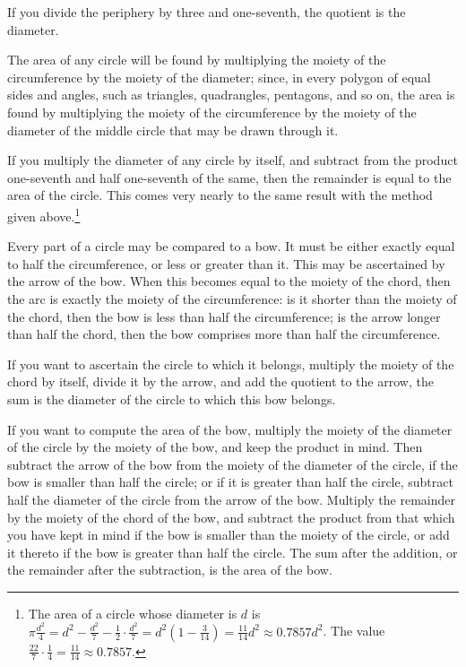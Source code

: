 If you divide the periphery by three and one-seventh, the quotient is the diameter.

The area of any circle will be found by multiplying the moiety of the circumference by the moiety of the diameter; since, in every polygon of equal sides and angles, such as triangles, quadrangles, pentagons, and so on, the area is found by multiplying the moiety of the circumference by the moiety of the diameter of the middle circle that may be drawn through it.

If you multiply the diameter of any circle by itself, and subtract from the product one-seventh and half one-seventh of the same, then the remainder is equal to the area of the circle. This comes very nearly to the same result with the method given above.\footnote{The area of a circle whose diameter is $d$ is $\pi\frac{d^2}{4} = d^2 - \frac{d^2}{7} - \frac{1}{2} \cdot \frac{d^2}{7} = d^2(1 - \frac{3}{14}) = \frac{11}{14}d^2 \approx 0.7857d^2$. The value $\frac{22}{7} \cdot \frac{1}{4} = \frac{11}{14} \approx 0.7857$.}

Every part of a circle may be compared to a bow. It must be either exactly equal to half the circumference, or less or greater than it. This may be ascertained by the arrow of the bow. When this becomes equal to the moiety of the chord, then the arc is exactly the moiety of the circumference: is it shorter than the moiety of the chord, then the bow is less than half the circumference; is the arrow longer than half the chord, then the bow comprises more than half the circumference.

If you want to ascertain the circle to which it belongs, multiply the moiety of the chord by itself, divide it by the arrow, and add the quotient to the arrow, the sum is the diameter of the circle to which this bow belongs.

If you want to compute the area of the bow, multiply the moiety of the diameter of the circle by the moiety of the bow, and keep the product in mind. Then subtract the arrow of the bow from the moiety of the diameter of the circle, if the bow is smaller than half the circle; or if it is greater than half the circle, subtract half the diameter of the circle from the arrow of the bow. Multiply the remainder by the moiety of the chord of the bow, and subtract the product from that which you have kept in mind if the bow is smaller than the moiety of the circle, or add it thereto if the bow is greater than half the circle. The sum after the addition, or the remainder after the subtraction, is the area of the bow.

